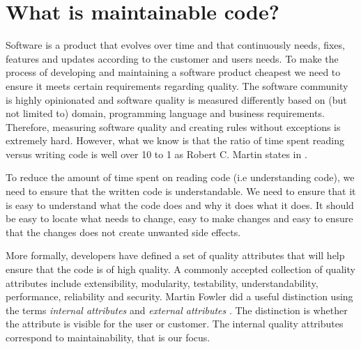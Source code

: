 \documentclass{report}
\begin{document}
\section{What is maintainable code?}
Software is a product that evolves over time and that continuously needs, fixes, features and updates according to the customer and users needs. To make the process of developing and maintaining a software product cheapest we need to ensure it meets certain requirements regarding quality. The software community is highly opinionated and software quality is measured differently based on (but not limited to) domain, programming language and business requirements. Therefore, measuring software quality and creating rules without exceptions is extremely hard. However, what we know is that the ratio of time spent reading versus writing code is well over 10 to 1 as Robert C. Martin states in \cite{Martin:2008:CCH:1388398}.

To reduce the amount of time spent on reading code (i.e understanding code), we need to ensure that the written code is understandable. We need to ensure that it is easy to understand what the code does and why it does what it does. It should be easy to locate what needs to change, easy to make changes and easy to ensure that the changes does not create unwanted side effects. \hfill 
\hfill \newline

More formally, developers have defined a set of quality attributes that will help ensure that the code is of high quality. A commonly accepted collection of quality attributes include extensibility, modularity, testability, understandability, performance, reliability and security. Martin Fowler did a useful distinction using the terms \textit{internal attributes} and \textit{external attributes} \cite{internalExternal}. The distinction is whether the attribute is visible for the user or customer. The internal quality attributes correspond to maintainability, that is our focus. 
\end{document}
